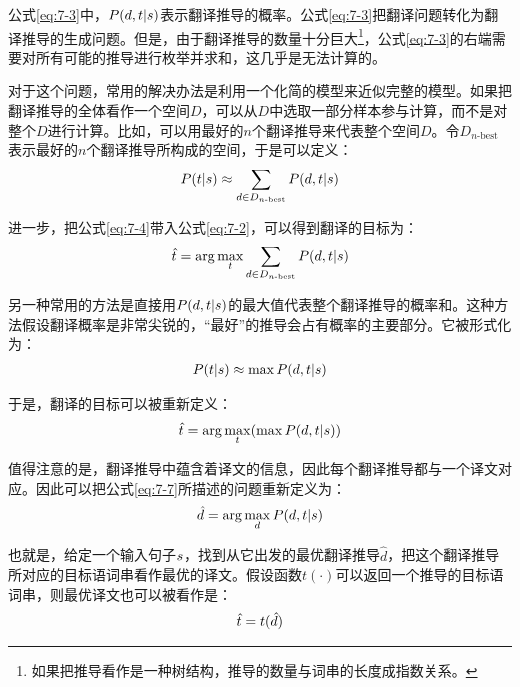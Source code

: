 \parinterval 公式\eqref{eq:7-3}中，${P}(d,{t}|{s})$表示翻译推导的概率。公式\eqref{eq:7-3}把翻译问题转化为翻译推导的生成问题。但是，由于翻译推导的数量十分巨大\footnote[3]{如果把推导看作是一种树结构，推导的数量与词串的长度成指数关系。}，公式\eqref{eq:7-3}的右端需要对所有可能的推导进行枚举并求和，这几乎是无法计算的。

\parinterval 对于这个问题，常用的解决办法是利用一个化简的模型来近似完整的模型。如果把翻译推导的全体看作一个空间$D$，可以从$D$中选取一部分样本参与计算，而不是对整个$D$进行计算。比如，可以用最好的$n$个翻译推导来代表整个空间$D$。令$D_{n\textrm{-best}}$表示最好的$n$个翻译推导所构成的空间，于是可以定义：
\begin{eqnarray}
{P}({t}|{s}) \approx \sum_{d \in D_{n\textrm{-best}}} {P}(d,{t}|{s})
\label{eq:7-4}
\end{eqnarray}

\parinterval 进一步，把公式\eqref{eq:7-4}带入公式\eqref{eq:7-2}，可以得到翻译的目标为：
\begin{eqnarray}
\hat{{t}} = \arg\max_{{t}} \sum_{d \in D_{n\textrm{-best}}} {P}(d,{t}|{s})
\label{eq:7-5}
\end{eqnarray}

\parinterval 另一种常用的方法是直接用${P}(d,{t}|{s})$的最大值代表整个翻译推导的概率和。这种方法假设翻译概率是非常尖锐的，“最好”的推导会占有概率的主要部分。它被形式化为：
\begin{eqnarray}
{P}({t}|{s}) \approx \max {P}(d,{t}|{s})
\label{eq:7-6}
\end{eqnarray}

\parinterval 于是，翻译的目标可以被重新定义：
\begin{eqnarray}
\hat{{t}} = \arg\max_{{t}} (\max {P}(d,{t}|{s}))
\label{eq:7-7}
\end{eqnarray}

\parinterval 值得注意的是，翻译推导中蕴含着译文的信息，因此每个翻译推导都与一个译文对应。因此可以把公式\eqref{eq:7-7}所描述的问题重新定义为：
\begin{eqnarray}
\hat{d} = \arg\max_{d} {P}(d,{t}|{s})
\label{eq:7-8}
\end{eqnarray}

\parinterval 也就是，给定一个输入句子${s}$，找到从它出发的最优翻译推导$\hat{d}$，把这个翻译推导所对应的目标语词串看作最优的译文。假设函数$t(\cdot)$可以返回一个推导的目标语词串，则最优译文也可以被看作是：
\begin{eqnarray}
\hat{{t}} = t(\hat{d})
\label{eq:7-9}
\end{eqnarray}

